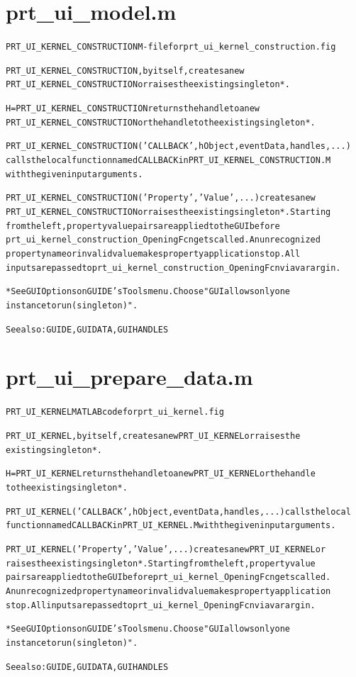 \section{prt\_ui\_model.m}
\begin{alltt}

 PRT\_UI\_KERNEL\_CONSTRUCTION M-file for prt\_ui\_kernel\_construction.fig
 
 PRT\_UI\_KERNEL\_CONSTRUCTION, by itself, creates a new 
 PRT\_UI\_KERNEL\_CONSTRUCTION or raises the existing singleton*.
 
 H = PRT\_UI\_KERNEL\_CONSTRUCTION returns the handle to a new 
 PRT\_UI\_KERNEL\_CONSTRUCTION or the handle to the existing singleton*.
 
 PRT\_UI\_KERNEL\_CONSTRUCTION('CALLBACK',hObject,eventData,handles,...)
 calls the local function named CALLBACK in PRT\_UI\_KERNEL\_CONSTRUCTION.M 
 with the given input arguments.
 
 PRT\_UI\_KERNEL\_CONSTRUCTION('Property','Value',...) creates a new 
 PRT\_UI\_KERNEL\_CONSTRUCTION or raises the existing singleton*.  Starting 
 from the left, property value pairs are applied to the GUI before 
 prt\_ui\_kernel\_construction\_OpeningFcn gets called.  An unrecognized 
 property name or invalid value makes property application stop.  All 
 inputs are passed to prt\_ui\_kernel\_construction\_OpeningFcn via varargin.
 
 *See GUI Options on GUIDE's Tools menu.  Choose "GUI allows only one
 instance to run (singleton)".
 
 See also: GUIDE, GUIDATA, GUIHANDLES
\end{alltt}


\section{prt\_ui\_prepare\_data.m}
\begin{alltt}

 PRT\_UI\_KERNEL MATLAB code for prt\_ui\_kernel.fig
 
 PRT\_UI\_KERNEL, by itself, creates a new PRT\_UI\_KERNEL or raises the 
 existing singleton*.
 
 H = PRT\_UI\_KERNEL returns the handle to a new PRT\_UI\_KERNEL or the handle
 to the existing singleton*.
 
 PRT\_UI\_KERNEL('CALLBACK',hObject,eventData,handles,...) calls the local
 function named CALLBACK in PRT\_UI\_KERNEL.M with the given input arguments.
 
 PRT\_UI\_KERNEL('Property','Value',...) creates a new PRT\_UI\_KERNEL or 
 raises the existing singleton*.  Starting from the left, property value 
 pairs are applied to the GUI before prt\_ui\_kernel\_OpeningFcn gets called.
 An unrecognized property name or invalid value makes property application
 stop.  All inputs are passed to prt\_ui\_kernel\_OpeningFcn via varargin.
 
 *See GUI Options on GUIDE's Tools menu.  Choose "GUI allows only one
  instance to run (singleton)".
 
 See also: GUIDE, GUIDATA, GUIHANDLES
\end{alltt}


